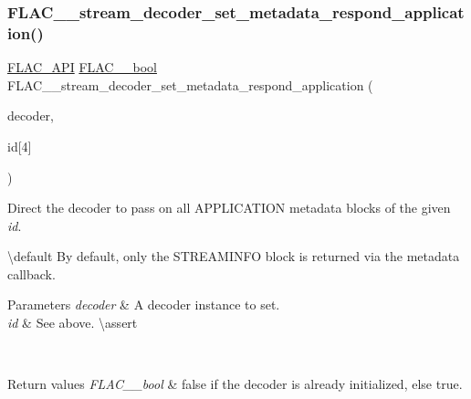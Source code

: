 \subsubsection{\texorpdfstring{FLAC\_\_stream\_decoder\_set\_metadata\_respond\_application()}{FLAC\_\_stream\_decoder\_set\_metadata\_respond\_application()}}
{\footnotesize\ttfamily \mbox{\hyperlink{group__flac__export_ga56ca07df8a23310707732b1c0007d6f5}{F\+L\+A\+C\+\_\+\+A\+PI}} \mbox{\hyperlink{ordinals_8h_a95103469f1cbd78b8cf250194985b34e}{F\+L\+A\+C\+\_\+\+\_\+bool}} F\+L\+A\+C\+\_\+\+\_\+stream\+\_\+decoder\+\_\+set\+\_\+metadata\+\_\+respond\+\_\+application (\begin{DoxyParamCaption}\item[{\mbox{\hyperlink{struct_f_l_a_c_____stream_decoder}{F\+L\+A\+C\+\_\+\+\_\+\+Stream\+Decoder}} $\ast$}]{decoder,  }\item[{const \mbox{\hyperlink{ordinals_8h_a5eb569b12d5b047cdacada4d57924ee3}{F\+L\+A\+C\+\_\+\+\_\+byte}}}]{id\mbox{[}4\mbox{]} }\end{DoxyParamCaption})}

Direct the decoder to pass on all A\+P\+P\+L\+I\+C\+A\+T\+I\+ON metadata blocks of the given {\itshape id}.

\textbackslash{}default By default, only the {\ttfamily S\+T\+R\+E\+A\+M\+I\+N\+FO} block is returned via the metadata callback. 
\begin{DoxyParams}{Parameters}
{\em decoder} & A decoder instance to set. \\
\hline
{\em id} & See above. \textbackslash{}assert 
\begin{DoxyCode}{1}
\end{DoxyCode}
 
\begin{DoxyCode}{1}
\end{DoxyCode}
 \\
\hline
\end{DoxyParams}

\begin{DoxyRetVals}{Return values}
{\em F\+L\+A\+C\+\_\+\+\_\+bool} & {\ttfamily false} if the decoder is already initialized, else {\ttfamily true}. \\
\hline
\end{DoxyRetVals}
\mbox{\label{group__flac__stream__decoder_ga7bb4d567a4a07c911a895b9cef7551d9}} 
